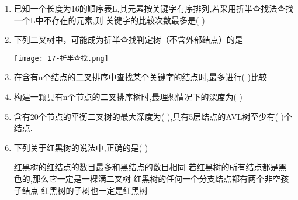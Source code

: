 \documentclass[12pt, a4paper, oneside, UTF8]{ctexbook}
\begin{document}
\begin{enumerate}
    \item \bl 已知一个长度为16的顺序表L,其元素按关键字有序排列,若采用折半查找法查找一个L中不存在的元素,则
    关键字的比较次数最多是(    ) 


    \item \bl 下列二叉树中，可能成为折半查找判定树（不含外部结点）的是
    \begin{center}
    \texttt{[image: 17-折半查找.png]}
    \end{center}

    
    \item 在含有n个结点的二叉排序中查找某个关键字的结点时,最多进行(   )比较 
    \item 构建一颗具有n个节点的二叉排序树时,最理想情况下的深度为(   )
    \item 含有20个节点的平衡二叉树的最大深度为(   ),具有5层结点的AVL树至少有(   )个结点.


    \item 下列关于红黑树的说法中,正确的是(   ) 
    \begin{choices}[1]
        \task 红黑树的红结点的数目最多和黑结点的数目相同
        \task 若红黑树的所有结点都是黑色的,那么它一定是一棵满二叉树
        \task 红黑树的任何一个分支结点都有两个非空孩子结点
        \task 红黑树的子树也一定是红黑树
    \end{choices}


\end{enumerate}
\end{document}
